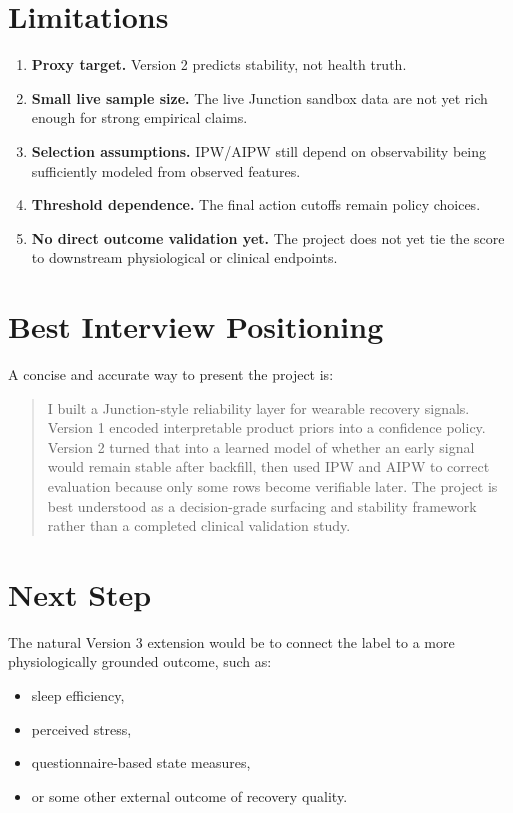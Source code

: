 \documentclass[11pt]{article}
\begin{document}
\section{Limitations}

\begin{enumerate}[leftmargin=1.5em]
    \item \textbf{Proxy target.} Version 2 predicts stability, not health truth.
    \item \textbf{Small live sample size.} The live Junction sandbox data are not yet rich enough for strong empirical claims.
    \item \textbf{Selection assumptions.} IPW/AIPW still depend on observability being sufficiently modeled from observed features.
    \item \textbf{Threshold dependence.} The final action cutoffs remain policy choices.
    \item \textbf{No direct outcome validation yet.} The project does not yet tie the score to downstream physiological or clinical endpoints.
\end{enumerate}

\section{Best Interview Positioning}

A concise and accurate way to present the project is:
\begin{quote}
I built a Junction-style reliability layer for wearable recovery signals. Version 1 encoded interpretable product priors into a confidence policy. Version 2 turned that into a learned model of whether an early signal would remain stable after backfill, then used IPW and AIPW to correct evaluation because only some rows become verifiable later. The project is best understood as a decision-grade surfacing and stability framework rather than a completed clinical validation study.
\end{quote}

\section{Next Step}

The natural Version 3 extension would be to connect the label to a more physiologically grounded outcome, such as:
\begin{itemize}[leftmargin=1.5em]
    \item sleep efficiency,
    \item perceived stress,
    \item questionnaire-based state measures,
    \item or some other external outcome of recovery quality.
\end{itemize}
\end{document}
